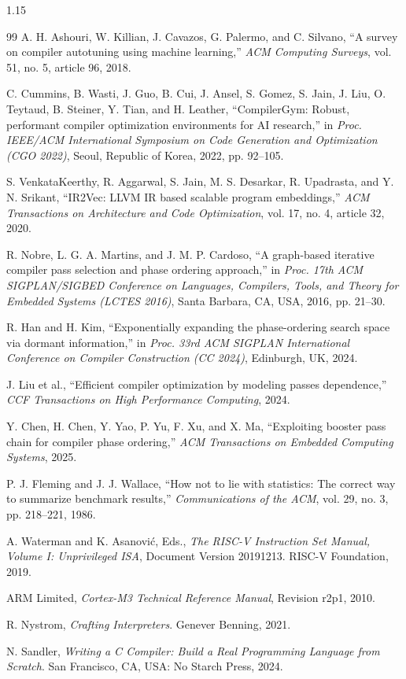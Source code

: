 \begin{spacing}{1.15}
\begin{thebibliography}{99}
 A. H. Ashouri, W. Killian, J. Cavazos, G. Palermo, and C. Silvano, ``A survey on compiler autotuning using machine learning,'' \emph{ACM Computing Surveys}, vol. 51, no. 5, article 96, 2018.

 C. Cummins, B. Wasti, J. Guo, B. Cui, J. Ansel, S. Gomez, S. Jain, J. Liu, O. Teytaud, B. Steiner, Y. Tian, and H. Leather, ``CompilerGym: Robust, performant compiler optimization environments for AI research,'' in \emph{Proc. IEEE/ACM International Symposium on Code Generation and Optimization (CGO 2022)}, Seoul, Republic of Korea, 2022, pp. 92--105.

 S. VenkataKeerthy, R. Aggarwal, S. Jain, M. S. Desarkar, R. Upadrasta, and Y. N. Srikant, ``IR2Vec: LLVM IR based scalable program embeddings,'' \emph{ACM Transactions on Architecture and Code Optimization}, vol. 17, no. 4, article 32, 2020.

 R. Nobre, L. G. A. Martins, and J. M. P. Cardoso, ``A graph-based iterative compiler pass selection and phase ordering approach,'' in \emph{Proc. 17th ACM SIGPLAN/SIGBED Conference on Languages, Compilers, Tools, and Theory for Embedded Systems (LCTES 2016)}, Santa Barbara, CA, USA, 2016, pp. 21--30.

 R. Han and H. Kim, ``Exponentially expanding the phase-ordering search space via dormant information,'' in \emph{Proc. 33rd ACM SIGPLAN International Conference on Compiler Construction (CC 2024)}, Edinburgh, UK, 2024.

 J. Liu et al., ``Efficient compiler optimization by modeling passes dependence,'' \emph{CCF Transactions on High Performance Computing}, 2024.

 Y. Chen, H. Chen, Y. Yao, P. Yu, F. Xu, and X. Ma, ``Exploiting booster pass chain for compiler phase ordering,'' \emph{ACM Transactions on Embedded Computing Systems}, 2025.

 P. J. Fleming and J. J. Wallace, ``How not to lie with statistics: The correct way to summarize benchmark results,'' \emph{Communications of the ACM}, vol. 29, no. 3, pp. 218--221, 1986.

 A. Waterman and K. Asanovi\'{c}, Eds., \emph{The RISC-V Instruction Set Manual, Volume I: Unprivileged ISA}, Document Version 20191213. RISC-V Foundation, 2019.

 ARM Limited, \emph{Cortex-M3 Technical Reference Manual}, Revision r2p1, 2010.

 R. Nystrom, \emph{Crafting Interpreters}. Genever Benning, 2021.

 N. Sandler, \emph{Writing a C Compiler: Build a Real Programming Language from Scratch}. San Francisco, CA, USA: No Starch Press, 2024.

\end{thebibliography}
\end{spacing}
